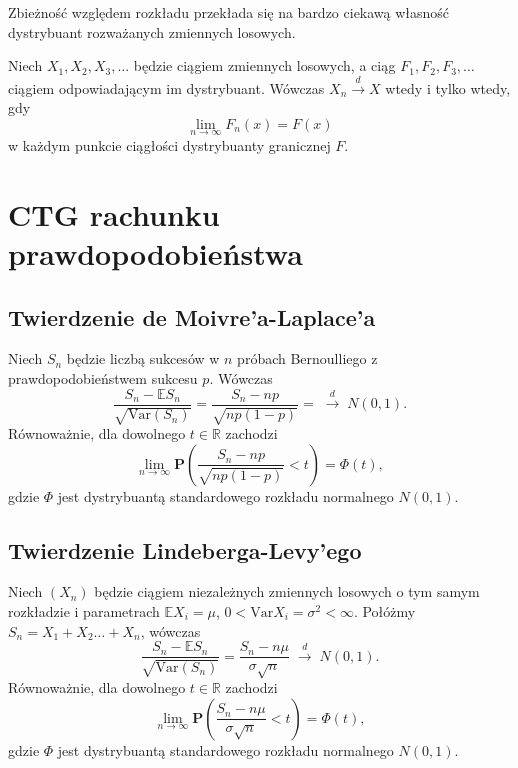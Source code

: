 	Zbieżność względem rozkładu przekłada się na bardzo ciekawą własność dystrybuant rozważanych zmiennych losowych.
	
	\begin{tw}
	Niech $X_1, X_2, X_3, \ldots$ będzie ciągiem zmiennych losowych, a ciąg $F_1, F_2, F_3, \ldots$ ciągiem odpowiadającym im dystrybuant. Wówczas $X_n \stackrel{d}{\to} X$ wtedy i tylko wtedy, gdy
		\begin{equation*}
			\lim\limits_{n \to \infty} F_n(x) = F(x)
		\end{equation*}
	w każdym punkcie ciągłości dystrybuanty granicznej $F$.
	\end{tw}

\section{CTG rachunku prawdopodobieństwa}
\subsection{Twierdzenie de Moivre’a-Laplace’a}
\begin{tw}
	Niech $S_n$ będzie liczbą sukcesów w $n$ próbach Bernoulliego z prawdopodobieństwem sukcesu $p$. Wówczas
	\begin{equation*}
		 \frac{S_n - \mathbb{E}S_n}{\sqrt{\text{Var}(S_n)}} = \frac{S_n - np}{\sqrt{np(1-p)}} = \; \stackrel{d}{\to} \; N(0,1). 
	\end{equation*}
	Równoważnie, dla dowolnego $t \in \mathbb{R}$ zachodzi
	\begin{equation*}
	\lim_{n \to \infty} \textbf{P} 
	\left(
		\frac{S_n - np}{\sqrt{np(1-p)}} < t
	\right)
	= \Phi(t),
	\end{equation*}
	gdzie $\Phi$ jest dystrybuantą standardowego rozkładu normalnego $N(0,1)$.
\end{tw}


\subsection{Twierdzenie Lindeberga-Levy'ego}
\begin{tw}
		Niech $(X_n)$ będzie ciągiem niezależnych zmiennych losowych o tym samym rozkładzie i parametrach $\mathbb{E}X_i = \mu$, $0 < \text{Var}X_i = \sigma^2 < \infty$. Połóżmy $S_n = X_1 + X_2 \ldots + X_n$, wówczas 
	\begin{equation*}
		 \frac{S_n - \mathbb{E}S_n}{\sqrt{\text{Var}(S_n)}} = 
		 \frac{S_n - n\mu}{\sigma \sqrt{n}} 
		  \; \stackrel{d}{\to} \; 
		  N(0,1).
	\end{equation*}
	Równoważnie, dla dowolnego $t \in \mathbb{R}$ zachodzi
	\begin{equation*}
		\lim_{n \to \infty} \textbf{P} 
		\left(
			 \frac{S_n - n\mu}{\sigma \sqrt{n}} < t
		\right)
		= \Phi(t),
	\end{equation*}
	gdzie $\Phi$ jest dystrybuantą standardowego rozkładu normalnego $N(0,1)$.
\end{tw}
